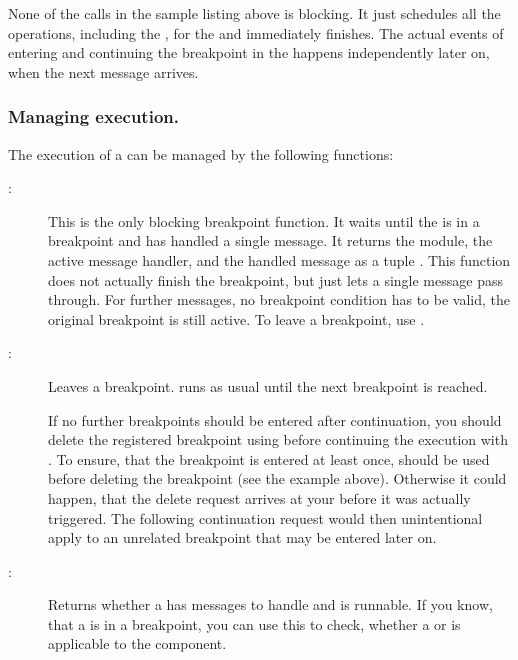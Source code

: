 None of the calls in the sample listing above is blocking. It just schedules
all the operations, including the , for the
 and immediately finishes. The actual events of
entering and continuing the breakpoint in the 
happens independently later on, when the next  message arrives.

\subsubsection{Managing execution.}

The execution of a  can be managed by the
following functions:

\begin{description}
\item[:] This is the only blocking
  breakpoint function. It waits until the  is in a
  breakpoint and has handled a single message.  It returns the module, the
  active message handler, and the handled message as a tuple .  This function does not actually finish the breakpoint,
  but just lets a single message pass through. For further messages, no
  breakpoint condition has to be valid, the original breakpoint is still
  active. To leave a breakpoint, use .

\item[:]
  Leaves a breakpoint.  runs as usual until the
  next breakpoint is reached.

  If no further breakpoints should be entered after continuation, you should
  delete the registered breakpoint using 
  before continuing the execution with
  . To ensure, that the breakpoint is
  entered at least once,  should be
  used before deleting the breakpoint (see the example above). Otherwise it
  could happen, that the delete request arrives at your
   before it was actually triggered. The following
  continuation request would then unintentional apply to an unrelated
  breakpoint that may be entered later on.

\item[:] Returns whether a
   has messages to handle and is runnable. If you
  know, that a  is in a breakpoint, you can use
  this to check, whether a  or
   is applicable to the component.

\end{description}

